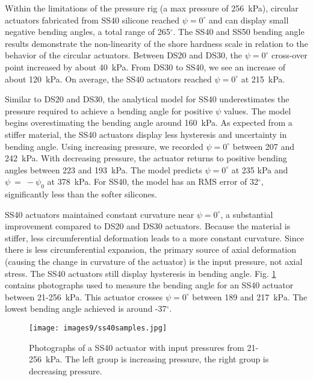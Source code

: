 Within the limitations of the pressure rig (a max pressure of 256~kPa), circular actuators fabricated from SS40 silicone reached $\psi=0^\circ$ and can display small negative bending angles, a total range of 265$^\circ$. The SS40 and SS50 bending angle results demonstrate the non-linearity of the shore hardness scale in relation to the behavior of the circular actuators. Between DS20 and DS30, the $\psi=0^\circ$ cross-over point increased by about 40~kPa. From DS30 to SS40, we see an increase of about 120~kPa. On average, the SS40 actuators reached $\psi=0^\circ$ at 215~kPa. 

Similar to DS20 and DS30, the analytical model for SS40 underestimates the pressure required to achieve a bending angle for positive $\psi$ values. The model begins overestimating the bending angle around 160~kPa. As expected from a stiffer material, the SS40 actuators display less hysteresis and uncertainty in bending angle. Using increasing pressure, we recorded $\psi=0^\circ$ between 207 and 242~kPa. With decreasing pressure, the actuator returns to positive bending angles between 223 and 193~kPa. The model predicts $\psi=0^\circ$ at 235 kPa and $\psi~=~-\psi_0$ at 378~kPa. For SS40, the model has an RMS error of 32$^\circ$, significantly less than the softer silicones. 

SS40 actuators maintained constant curvature near $\psi=0^\circ$, a substantial improvement compared to DS20 and DS30 actuators. Because the material is stiffer, less circumferential deformation leads to a more constant curvature. Since there is less circumferential expansion, the primary source of axial deformation (causing the change in curvature of the actuator) is the input pressure, not axial stress. The SS40 actuators still display hysteresis in bending angle. Fig. \ref{fig:ss40samples} contains photographs used to measure the bending angle for an SS40 actuator between 21-256~kPa. This actuator crosses $\psi=0^\circ$ between 189 and 217~kPa. The lowest bending angle achieved is around -37$^\circ$. 

\begin{figure}[ht]
    \centering
     \texttt{[image: images9/ss40samples.jpg]}
    \caption{Photographs of a SS40 actuator with input pressures from 21-256~kPa. The left group is increasing pressure, the right group is decreasing pressure.}
    \label{fig:ss40samples}
\end{figure}